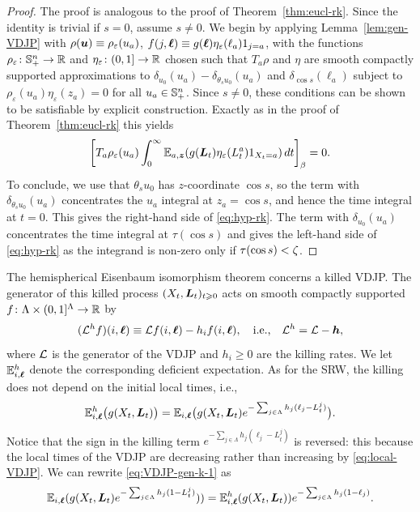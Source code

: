\documentclass[11pt,a4paper]{article}
\begin{document}
\begin{proof}
  The proof is analogous to the proof of Theorem~\ref{thm:eucl-rk}.
  Since the identity is trivial if $s=0$, assume $s\neq 0$.  We begin
  by applying Lemma~\ref{lem:gen-VDJP} with
  $\rho(\boldsymbol{u}) \equiv \rho_{\varepsilon}(u_{a})$,
  $f(j,\boldsymbol{\ell}) \equiv g(\boldsymbol{\ell})\eta_{\varepsilon}(\ell_a){1_{j=a}}$, with the functions
  $\rho_\varepsilon \colon {\ensuremath{\mathbb S}}^n_{+} \to \mathbb{R}$ and $\eta_{\varepsilon}
  \colon (0,1] \to\mathbb{R}$ chosen such that $T_{a}\rho$ and $\eta$ are smooth
  compactly supported approximations to
  $\delta_{u_{0}}(u_a)-\delta_{\theta_{s}{u_{0}}}(u_a)$ and
  $\delta_{\cos{s}}(\ell_a)$ subject to $\rho_{\varepsilon}(u_a)\eta_{\varepsilon}(z_a)=0$ for
  all $u_a\in {\ensuremath{\mathbb S}}^n_{+}$.  Since $s\neq 0$, these conditions can be shown
  to be satisfiable by explicit construction. Exactly as in the proof
  of Theorem~\ref{thm:eucl-rk} this yields
  \begin{equation}
    \label{eq:RKhyp2}
    \cb{T_{a}\rho_\varepsilon(u_{a})\int_{0}^{\infty}\E_{a,\V{z}}(g(\V{L}_{t})\eta_\varepsilon(L_{t}^{a}){1_{X_t=a}})\,dt}_{\beta}=0.
  \end{equation}
  To conclude, we use that $\theta_{s}{u_{0}}$ has $z$-coordinate $\cos s$,
  so the term with $\delta_{\theta_{s}{u_{0}}}(u_{a})$ concentrates the
  $u_a$ integral at $z_{a}=\cos s$, and hence the time integral at
  $t=0$. This gives the right-hand side of \eqref{eq:hyp-rk}.  The
  term with $\delta_{u_{0}}(u_{a})$ concentrates the time integral at
  $\tau(\cos s)$ and gives the left-hand side of \eqref{eq:hyp-rk} as
  the integrand is non-zero only if $\tau(\cos s)<\zeta$.
\end{proof}


The hemispherical Eisenbaum isomorphism theorem concerns a killed
VDJP. The generator of this killed process
$(X_{t},\boldsymbol{L}_{t})_{t\geqslant 0}$ acts on smooth compactly supported
$f\colon \Lambda\times(0,1]^{\Lambda}\to \mathbb{R}$ by
\begin{equation}
  \label{eq:VDJP-gen-k}
  (\mathcal L^{h} f)(i,\boldsymbol{\ell})
  \equiv \mathcal L f(i,\boldsymbol{\ell})  - h_{i}f(i,\boldsymbol{\ell}) 
  ,\quad \text{i.e.,}\quad
  \mathcal L^h = \mathcal L - \boldsymbol{h},
\end{equation}
where $\mathcal L$ is the generator of the VDJP and $h_i\geq 0$ are the
killing rates. We let $\mathbb{E}^{h}_{i,\boldsymbol{\ell}}$ denote the corresponding
deficient expectation. As for the SRW, the killing does not depend on the
initial local times, i.e.,
\begin{equation}
  \label{eq:VDJP-gen-k-1}
  \mathbb{E}^{h}_{i,\boldsymbol{\ell}} \bigl({g(X_{t},\boldsymbol{L}_{t})}\bigr) 
  = 
  \mathbb{E}_{i,\boldsymbol{\ell}}\bigl({g(X_{t},\boldsymbol{L}_{t})e^{-\sum_{j\in\Lambda}h_{j}(\ell_j-L^{j}_{t})}}\bigr).
\end{equation}
Notice that the sign in the killing term
$e^{-\sum_{j\in\Lambda}h_{j}(\ell_j-L^{j}_{t})}$ is reversed: this
because the local times of the VDJP are decreasing rather than
increasing by \eqref{eq:local-VDJP}. We can rewrite \eqref{eq:VDJP-gen-k-1} as
\begin{equation}
  \label{eq:VDJP-nokill}
  \mathbb{E}_{i,\boldsymbol{\ell}}(g(X_t,\boldsymbol{L}_t)e^{-\sum_{j\in\Lambda} h_j(1-L_t^j)})) 
  = \mathbb{E}_{i,\boldsymbol{\ell}}^h(g(X_t,\boldsymbol{L}_t))e^{-\sum_{j\in\Lambda} h_j (1-\ell_j)}.
\end{equation}
\end{document}
